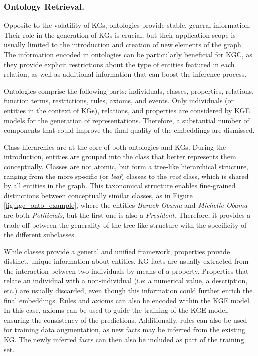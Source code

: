 \subsubsection{Ontology Retrieval.} \label{subsec:s4_onto_retrieval}
Opposite to the volatility of KGs, ontologies provide stable, general information. Their role in the generation of KGs is crucial, but their application scope is usually limited to the introduction and creation of new elements of the graph. The information encoded in ontologies can be particularly beneficial for KGC, as they provide explicit restrictions about the type of entities featured in each relation, as well as additional information that can boost the inference process.

Ontologies comprise the following parts: individuals, classes, properties, relations, function terms, restrictions, rules, axioms, and events. Only individuals (or entities in the context of KGs), relations, and properties are considered by KGE models for the generation of representations. Therefore, a substantial number of components that could improve the final quality of the embeddings are dismissed.

Class hierarchies are at the core of both ontologies and KGs. During the introduction, entities are grouped into the class that better represents them conceptually. Classes are not atomic, but form a tree-like hierarchical structure, ranging from the more specific (or \textit{leaf}) classes to the \textit{root} class, which is shared by all entities in the graph. This taxonomical structure enables fine-grained distinctions between conceptually similar classes, as in Figure \ref{fig:kgc_onto_example}, where the entities \textit{Barack Obama} and \textit{Michelle Obama} are both \textit{Politicials}, but the first one is also a \textit{President}. Therefore, it provides a trade-off between the generality of the tree-like structure with the specificity of the different subclasses. 

While classes provide a general and unified framework, properties provide distinct, unique information about entities. KG facts are usually extracted from the interaction between two individuals by means of a property. Properties that relate an individual with a non-individual (i.e: a numerical value, a description, etc.) are usually discarded, even though this information could further enrich the final embeddings. Rules and axioms can also be encoded within the KGE model. In this case, axioms can be used to guide the training of the KGE model, ensuring the consistency of the predictions. Additionally, rules can also be used for training data augmentation, as new facts may be inferred from the existing KG. The newly inferred facts can then also be included as part of the training set.

